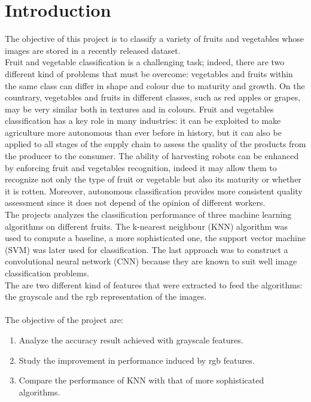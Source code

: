 \documentclass{article}
\begin{document}
\section{Introduction}
The objective of this project is to classify a variety of fruits and vegetables whose images are stored in a recently released dataset.\\
Fruit and vegetable classification is a challenging task; indeed, there are two different kind of problems that must be overcome: vegetables and fruits within the same class can differ in shape and colour due to maturity and growth. On the countrary, vegetables and fruits in different classes, such as red apples or grapes, may be very similar both in textures and in colours. 
Fruit and vegetables classification has a key role in many industries: it can be exploited to make agriculture more autonomous than ever before in history, but it can also be applied to all stages of the supply chain to assess the quality of the products from the producer to the consumer. 
The ability of harvesting robots can be enhanced by enforcing fruit and vegetables recognition, indeed it may allow them to recognize not only the type of fruit or vegetable but also its maturity or whether it is rotten. Moreover, autonomous classification provides more consistent quality assessment since it does not depend of the opinion of different workers. \cite{review}
\\
The projects analyzes the classification performance of three machine learning algorithms on different fruits. The k-nearest neighbour (KNN) algorithm was used to compute a baseline, a more sophisticated one, the support vector machine (SVM) was later used for classification. The last approach was to construct a convolutional neural network (CNN) because they are known to suit well image classification problems. \\
The are two different kind of features that were extracted to feed the algorithms: the grayscale and the rgb representation of the images.\\\\
The objective of the project are:
\begin{enumerate}
\item Analyze the accuracy result achieved with grayscale features.
\item Study the improvement in performance induced by rgb features.
\item Compare the performance of KNN with that of more sophisticated algorithms.
\end{enumerate}
\end{document}
